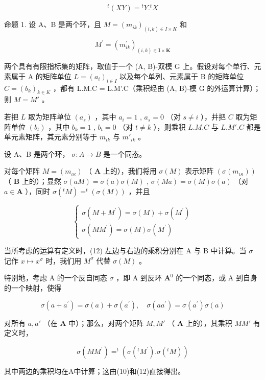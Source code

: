 \[
{ } ^ { t } ( X Y ) = { } ^ { t } Y . { } ^ { t } X\tag{11}
\]

命题 1. 设 A、B 是两个环，且 \(M = (m_{ik})_{(i,k) \in I \times K}\) 和

\[
M ^ {\prime} = \left(m _ {i k} ^ {\prime}\right) _ {(i, k) \in \mathbf {I} \times \mathbf {K}}
\]

两个具有有限指标集的矩阵，取值于一个 (A, B)-双模 G 上。假设对每个单行、元素属于 A 的矩阵单位 \(L = (a_{i})_{i \in I}\) 以及每个单列、元素属于 B 的矩阵单位 \(C = (b_{k})_{k \in K}\) ，都有 L.M.C = L.M'.C（乘积经由 (A, B)-模 G 的外运算计算）；则 \(M = M'\) 。

若把 \(L\) 取为矩阵单位 \((a_s)\) ，其中 \(a_i = 1\) , \(a_s = 0\) （对 \(s \neq i\) ），并把 \(C\) 取为矩阵单位 \((b_t)\) ，其中 \(b_k = 1\) , \(b_t = 0\) （对 \(t \neq k\) ），则乘积 \(L.M.C\) 与 \(L.M'.C\) 都是单元素矩阵，其元素分别等于 \(m_{ik}\) 与 \(m'_{ik}\) 。

设 A、B 是两个环， \(\sigma: A \to B\) 是一个同态。

对每个矩阵 \(M = (m_{\iota\kappa})\) （ \(\mathbf{A}\) 上的），我们将用 \(\sigma(M)\) 表示矩阵 \((\sigma(m_{\iota\kappa}))\) （ \(\mathbf{B}\) 上的）；显然 \(\sigma(aM) = \sigma(a)\sigma(M)\) , \(\sigma(Ma) = \sigma(M)\sigma(a)\) （对 \(a \in \mathbf{A}\) ），同时 \(\sigma(^t M) = ^t(\sigma(M))\) ，并且

\[
\left\{ \begin{array}{c} \sigma (M + M ^ {\prime}) = \sigma (M) + \sigma (M ^ {\prime}) \\ \sigma (M M ^ {\prime}) = \sigma (M) \sigma (M ^ {\prime}) \end{array} \right.\tag{12}
\]

当所考虑的运算有定义时，(12) 左边与右边的乘积分别在 A 与 B 中计算。当 \(\sigma\) 记作 \(x \mapsto x^{\sigma}\) 时，我们用 \(M^{\sigma}\) 代替 \(\sigma(M)\) 。

特别地，考虑 A 的一个反自同态 \(\sigma\) ，即 A 到反环 \(\mathbf{A}^0\) 的一个同态，或 A 到自身的一个映射，使得

\[
\sigma (a + a ^ {\prime}) = \sigma (a) + \sigma (a ^ {\prime}), \quad \sigma (a a ^ {\prime}) = \sigma (a ^ {\prime}) \sigma (a)
\]

对所有 \(a, a'\) （在 \(\mathbf{A}\) 中）；那么，对两个矩阵 \(M, M'\) （ \(\mathbf{A}\) 上的），其乘积 \(MM'\) 有定义时，

\[
\sigma (M M ^ {\prime}) = ^ {t} (\sigma (^ {t} M ^ {\prime}). \sigma (^ {t} M))\tag{13}
\]

其中两边的乘积均在A中计算；这由(10)和(12)直接得出。

